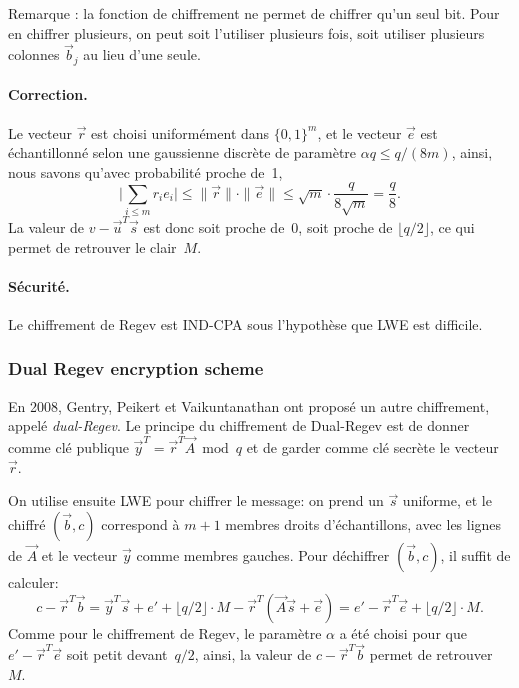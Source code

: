 Remarque : la fonction de chiffrement ne permet de chiffrer qu'un seul bit. Pour en chiffrer plusieurs, on peut soit l'utiliser plusieurs fois, soit utiliser plusieurs colonnes $\vec{b}_j$ au lieu d'une seule.

\paragraph{Correction.}
Le vecteur $\vec{r}$ est choisi uniformément dans $\{0,1 \}^m$, 
et le vecteur $\vec{e}$ est échantillonné selon une gaussienne discrète de paramètre 
$\alpha q \leq q/(8m)$, ainsi, nous savons qu'avec probabilité proche de~1, 
\[ 
\big| \sum_{i \leq m} r_i e_i \big| \leq \|\vec{r}\| \cdot \|\vec{e}\| \leq \sqrt{m} \cdot \frac{q}{8\sqrt{m}} = \frac{q}{8}.
\]
La valeur de $v - \vec{u}^T \vec{s}$ est donc soit proche de~$0$, soit proche de $\lfloor q/2 \rfloor$, ce qui permet de 
retrouver le clair~$M$.

\paragraph{Sécurité.}

\begin{theorem}
Le chiffrement de Regev est IND-CPA sous l'hypothèse que LWE est difficile. 
\end{theorem}


\subsubsection{Dual Regev encryption scheme}

En 2008, Gentry, Peikert et Vaikuntanathan ont proposé un autre chiffrement, appelé \emph{dual-Regev}. Le principe du chiffrement de Dual-Regev est de donner comme clé publique $\vec{y}^T = \vec{r}^T \vec{A}  \bmod q$ et de garder comme clé secrète le vecteur~$\vec{r}$.

On utilise ensuite LWE pour chiffrer le message: on prend un $\vec{s}$ uniforme, et le chiffré $(\vec{b},c)$ correspond à $m+1$ membres droits d'échantillons, avec les lignes de $\vec{A}$ 
et le vecteur $\vec{y}$ comme membres gauches. Pour déchiffrer $(\vec{b},c)$, il suffit de calculer:
\[
c - \vec{r}^T \vec{b} = \vec{y}^T \vec{s} + e' + \lfloor q/2 \rfloor \cdot M - \vec{r}^T (\vec{A} \vec{s} + \vec{e} ) 
= e'-\vec{r}^T \vec{e} + \lfloor q/2 \rfloor \cdot M.
\]
Comme pour le chiffrement de Regev, le paramètre $\alpha$ a été choisi pour que $e'-\vec{r}^T \vec{e}$ soit petit devant~$q/2$, ainsi, la valeur de $c - \vec{r}^T \vec{b}$ 
permet de retrouver~$M$.


